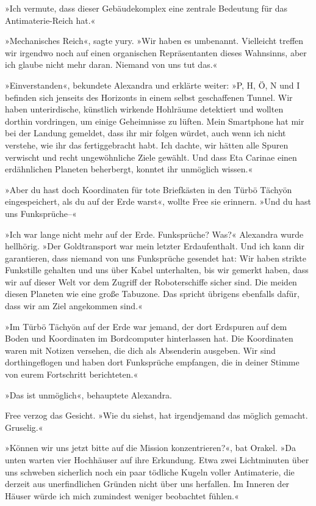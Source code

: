 »Ich vermute, dass dieser Gebäudekomplex eine zentrale Bedeutung für das Antimaterie-Reich hat.«

»Mechanisches Reich«, sagte yury. »Wir haben es umbenannt. Vielleicht treffen wir irgendwo noch auf einen organischen Repräsentanten dieses Wahnsinns, aber ich glaube nicht mehr daran. Niemand von uns tut das.«

»Einverstanden«, bekundete Alexandra und erklärte weiter: »P, H, Ö, N und I befinden sich jenseits des Horizonts in einem selbst geschaffenen Tunnel. Wir haben unterirdische, künstlich wirkende Hohlräume detektiert und wollten dorthin vordringen, um einige Geheimnisse zu lüften. Mein Smartphone hat mir bei der Landung gemeldet, dass ihr mir folgen würdet, auch wenn ich nicht verstehe, wie ihr das fertiggebracht habt. Ich dachte, wir hätten alle Spuren verwischt und recht ungewöhnliche Ziele gewählt. Und dass Eta Carinae einen erdähnlichen Planeten beherbergt, konntet ihr unmöglich wissen.«

»Aber du hast doch Koordinaten für tote Briefkästen in den Türbö Tächyön eingespeichert, als du auf der Erde warst«, wollte Free sie erinnern. »Und du hast uns Funksprüche–«

»Ich war lange nicht mehr auf der Erde. Funksprüche? Was?« Alexandra wurde hellhörig. »Der Goldtransport war mein letzter Erdaufenthalt. Und ich kann dir garantieren, dass niemand von uns Funksprüche gesendet hat: Wir haben strikte Funkstille gehalten und uns über Kabel unterhalten, bis wir gemerkt haben, dass wir auf dieser Welt vor dem Zugriff der Roboterschiffe sicher sind. Die meiden diesen Planeten wie eine große Tabuzone. Das spricht übrigens ebenfalls dafür, dass wir am Ziel angekommen sind.«

»Im Türbö Tächyön auf der Erde war jemand, der dort Erdspuren auf dem Boden und Koordinaten im Bordcomputer hinterlassen hat. Die Koordinaten waren mit Notizen versehen, die dich als Absenderin ausgeben. Wir sind dorthingeflogen und haben dort Funksprüche empfangen, die in deiner Stimme von eurem Fortschritt berichteten.«

»Das ist unmöglich«, behauptete Alexandra.

Free verzog das Gesicht. »Wie du siehst, hat irgendjemand das möglich gemacht. Gruselig.«

»Können wir uns jetzt bitte auf die Mission konzentrieren?«, bat Orakel. »Da unten warten vier Hochhäuser auf ihre Erkundung. Etwa zwei Lichtminuten über uns schweben sicherlich noch ein paar tödliche Kugeln voller Antimaterie, die derzeit aus unerfindlichen Gründen nicht über uns herfallen. Im Inneren der Häuser würde ich mich zumindest weniger beobachtet fühlen.«

